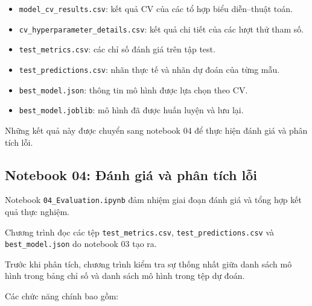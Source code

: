 \begin{itemize}
    \item \texttt{model\_cv\_results.csv}: kết quả CV của các tổ hợp biểu diễn--thuật toán.

    \item \texttt{cv\_hyperparameter\_details.csv}: kết quả chi tiết của các lượt thử tham số.

    \item \texttt{test\_metrics.csv}: các chỉ số đánh giá trên tập test.

    \item \texttt{test\_predictions.csv}: nhãn thực tế và nhãn dự đoán của từng mẫu.

    \item \texttt{best\_model.json}: thông tin mô hình được lựa chọn theo CV.

    \item \texttt{best\_model.joblib}: mô hình đã được huấn luyện và lưu lại.
\end{itemize}

Những kết quả này được chuyển sang notebook 04 để thực hiện đánh giá và phân tích lỗi.


\subsection{Notebook 04: Đánh giá và phân tích lỗi}

Notebook \texttt{04\_Evaluation.ipynb} đảm nhiệm giai đoạn đánh giá và tổng hợp kết quả thực nghiệm.

Chương trình đọc các tệp \texttt{test\_metrics.csv}, \texttt{test\_predictions.csv} và \texttt{best\_model.json} do notebook 03 tạo ra.

Trước khi phân tích, chương trình kiểm tra sự thống nhất giữa danh sách mô hình trong bảng chỉ số và danh sách mô hình trong tệp dự đoán.

Các chức năng chính bao gồm:

